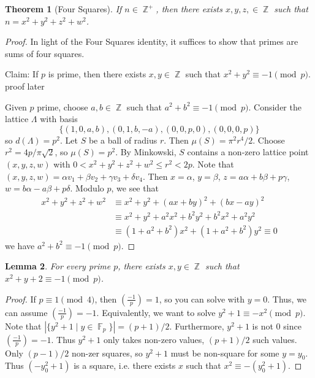 \documentclass[11pt, a4paper]{memoir}
\DeclareMathOperator{\Z}{{\mathbb{Z}}}
\DeclareMathOperator{\F}{{\mathbb{F}}}
\theoremstyle{change}
\newtheorem{theorem}{Theorem}[section]
\newtheorem{lemma}[theorem]{Lemma}
\theoremstyle{plain}
\theoremstyle{nonumberplain}
\newtheorem{proof}{Proof}
\newcommand{\lgs}[2]{\ensuremath{\left(\frac{#1}{#2}\right)}}
\begin{document}
\begin{theorem}[Four Squares]
    If $n\in\Z^+$, then there exists $x,y,z,\in\Z$ such that $n=x^2+y^2+z^2+w^2$.
\end{theorem}
\begin{proof}
    In light of the Four Squares identity, it suffices to show that primes are sums of four squares.

    Claim: If $p$ is prime, then there exists $x,y\in\Z$ such that $x^2+y^2\equiv -1\pmod{p}$.
    proof later

    Given $p$ prime, choose $a,b\in\Z$ such that $a^2+b^2\equiv -1\pmod{p}$.
    Consider the lattice $\Lambda$ with basis
    \begin{equation*}
        \{(1,0,a,b),(0,1,b,-a),(0,0,p,0),(0,0,0,p)\}
    \end{equation*}
    so $d(\Lambda)=p^2$.
    Let $S$ be a ball of radius $r$.
    Then $\mu(S)=\pi^2r^4/2$.
    Choose $r^2=4p/\pi\sqrt{2}$, so $\mu(S)=p^2$.
    By Minkowski, $S$ contains a non-zero lattice point $(x,y,z,w)$ with $0<x^2+y^2+z^2+w^2\leq r^2<2p$.
    Note that $(x,y,z,w)=\alpha v_1+\beta v_2+\gamma v_3+\delta v_4$.
    Then $x=\alpha$, $y=\beta$, $z=a\alpha+b\beta+p\gamma$, $w=b\alpha-a\beta+p\delta$.
    Modulo $p$, we see that
    \begin{align*}
        x^2+y^2+z^2+w^2 &\equiv x^2+y^2+(ax+by)^2+(bx-ay)^2\\
                        &\equiv x^2+y^2+a^2x^2+b^2y^2+b^2x^2+a^2y^2\\
                        &\equiv (1+a^2+b^2)x^2+(1+a^2+b^2)y^2\equiv 0
    \end{align*}
    we have $a^2+b^2\equiv -1\pmod{p}$.
\end{proof}
\begin{lemma}
    For every prime $p$, there exists $x,y\in\Z$ such that $x^2+y+2\equiv -1\pmod{p}$.
\end{lemma}
\begin{proof}
    If $p\equiv 1\pmod{4}$, then $\lgs{-1}{p}=1$, so you can solve with $y=0$.
    Thus, we can assume $\lgs{-1}{p}=-1$.
    Equivalently, we want to solve $y^2+1\equiv -x^2\pmod{p}$.
    Note that $|\{y^2+1\mid y\in\F_p\}|=(p+1)/2$.
    Furthermore, $y^2+1$ is not $0$ since $\lgs{-1}{p}=-1$.
    Thus $y^2+1$ only takes non-zero values, $(p+1)/2$ such values.
    Only $(p-1)/2$ non-zer squares, so $y^2+1$ must be non-square for some $y=y_0$.
    Thus $(-y_0^2+1)$ is a square, i.e. there exists $x$ such that $x^2\equiv-(y_0^2+1)$.
\end{proof}
\end{document}
